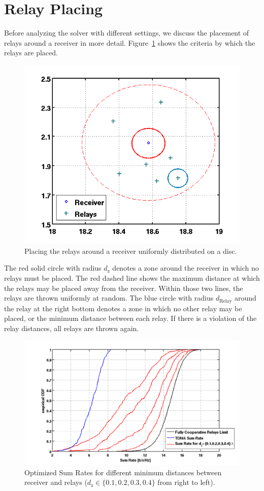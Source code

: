 \section{Relay Placing}
\label{sec:relay_placing}
Before analyzing the solver with different settings, we discuss the placement of relays around a receiver in more detail.
Figure~\ref{fig:cloud} shows the criteria by which the relays are placed.
\begin{figure}[h]
\centering
  \includegraphics[width=0.6\linewidth]{images/cloud.png}
\caption{Placing the relays around a receiver uniformly distributed on a disc.}
\label{fig:cloud}
\end{figure}
The red solid circle with radius $d_\text{z}$ denotes a zone around the receiver in which no relays must be placed.
The red dashed line shows the maximum distance at which the relays may be placed away from the receiver. 
Within those two lines, the relays are thrown uniformly at random.
The blue circle with radius $d_\text{Relay}$ around the relay at the right bottom denotes a zone in which no other relay may be placed, or the minimum distance between each relay.
If there is a violation of the relay distances, all relays are thrown again.
\begin{figure}[h]
\centering
  \includegraphics[width=0.8\linewidth]{images/Dzcomparison.png}
\caption{Optimized Sum Rates for different minimum distances between receiver and relays ($d_\text{z}\in\{0.1,0.2,0.3,0.4\}$ from right to left).}
\label{fig:dz_comparison}
\end{figure}

